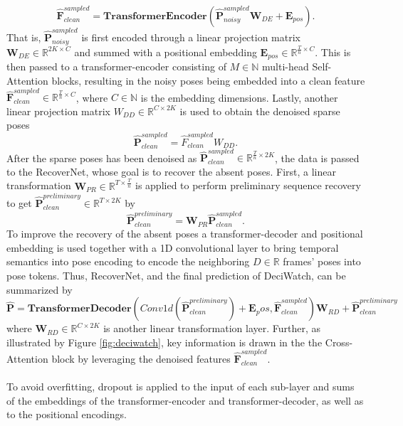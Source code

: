 \documentclass[./main.tex]{subfiles}
\begin{document}
\begin{equation}
    \hat{\bm{F}}_{clean} ^{sampled} = \textbf{TransformerEncoder} \left( \hat{\bm{P}}_{noisy} ^{sampled} \bm{W}_{DE} + \bm{E}_{pos} \right).
\end{equation}
That is, $\hat{\bm{P}}_{noisy} ^{sampled}$ is first encoded through a linear projection matrix $\bm{W}_{DE} \in \mathbb{R}^{2K \times C}$ and summed with a positional embedding $\bm{E}_{pos} \in \mathbb{R}^{\frac{T}{n} \times C}$. This is then passed to a transformer-encoder consisting of $M \in \mathbb{N}$ multi-head Self-Attention blocks, resulting in the noisy poses being embedded into a clean feature $\hat{\bm{F}}_{clean} ^{sampled} \in \mathbb{R}^{\frac{T}{n} \times C}$, where $C \in \mathbb{N}$ is the embedding dimensions. Lastly, another linear projection matrix $W_{DD} \in \mathbb{R}^{C \times 2K}$ is used to obtain the denoised sparse poses
\begin{equation}
    \hat{\bm{P}}_{clean} ^{sampled} = \hat{F}_{clean} ^{sampled} W_{DD}.
\end{equation}
After the sparse poses has been denoised as $\hat{\bm{P}}_{clean} ^{sampled} \in \mathbb{R}^{\frac{T}{n} \times 2K}$, the data is passed to the RecoverNet, whose goal is to recover the absent poses. First, a linear transformation $\bm{W}_{PR} \in \mathbb{R}^{T \times \frac{T}{n}}$ is applied to perform preliminary sequence recovery to get $\hat{\bm{P}}_{clean} ^{preliminary} \in \mathbb{R}^{T \times 2K}$ by
\begin{equation}
    \hat{\bm{P}}_{clean} ^{preliminary} = \bm{W}_{PR} \hat{\bm{P}}_{clean} ^{sampled}.
\end{equation}
To improve the recovery of the absent poses a transformer-decoder and positional embedding is used together with a 1D convolutional layer to bring temporal semantics into pose encoding to encode the neighboring $D \in \mathbb{R}$ frames' poses into pose tokens. Thus, RecoverNet, and the final prediction of DeciWatch, can be summarized by
\begin{equation}
    \hat{\bm{P}} = \textbf{TransformerDecoder}\left(Conv1d \left( \hat{\bm{P}}_{clean} ^{preliminary} \right) + \bm{E}_pos, \hat{\bm{F}}_{clean} ^{sampled} \right)\bm{W}_{RD} + \hat{\bm{P}}_{clean} ^{preliminary}
\end{equation}
where $\bm{W}_{RD} \in \mathbb{R}^{C \times 2K}$ is another linear transformation layer. Further, as illustrated by Figure \ref{fig:deciwatch}, key information is drawn in the the Cross-Attention block by leveraging the denoised features $\hat{\bm{F}}_{clean} ^{sampled}$.
\\
\\
To avoid overfitting, dropout is applied to the input of each sub-layer and sums of the embeddings of the transformer-encoder and transformer-decoder, as well as to the positional encodings.
\end{document}
